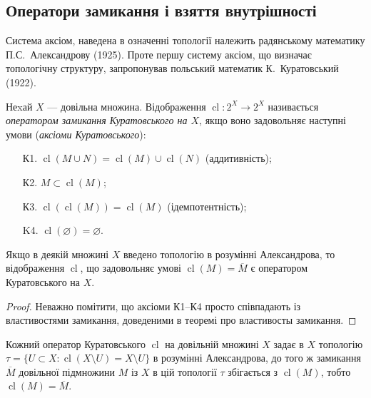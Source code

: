 \documentclass[a4paper, 12pt]{article}
\renewcommand{\emptyset}{\varnothing}
\DeclareMathOperator{\cl}{cl}
\begin{document}
\setcounter{section}{2}

\subsection{Оператори замикання і взяття внутрішності}

Система аксіом, наведена в означенні топології належить
радянському математику П.С.~Александрову (1925). Проте
першу систему аксіом, що визначає топологічну структуру, 
запропонував польський математик К.~Куратовський (1922).

\begin{definition}
	Неxай $X$ --- довільна множина. Відображення
	$\cl: 2^X \to 2^X$ називається \textit{оператором замикання
	Куратовського на $X$}, якщо воно задовольняє наступні
	умови (\textit{аксіоми Куратовського}):
	\begin{enumerate}
		\item[К1.] $\cl(M \cup N) = \cl(M) \cup \cl(N)$ (аддитивність);
		\item[К2.] $M \subset \cl(M)$;
		\item[К3.] $\cl(\cl(M)) = \cl(M)$ (ідемпотентність);
		\item[K4.] $\cl(\emptyset) = \emptyset$.
	\end{enumerate}
\end{definition}

\begin{theorem}
	Якщо в деякій множині $X$ введено топологію в
	розумінні Александрова, то відображення $\cl$, що
	задовольняє умові $\cl (M) = \overline{M}$ є оператором Куратовського
	на $X$.
\end{theorem}

\begin{proof}
	Неважно помітити, що аксіоми К1--К4 просто
	співпадають із властивостями замикання, доведеними в
	теоремі про властивосты замикання.
\end{proof}

\begin{theorem}
	Кожний оператор Куратовського $\cl$ на
	довільній множині $X$ задає в $X$ топологію
	$\tau = \{ U \subset X: \cl(X \setminus U) = X \setminus U\}$ в розумінні Александрова, до
	того ж замикання $\overline{M}$ довільної підмножини $M$ із $X$ в цій
	топології $\tau$ збігається з $\cl(M)$, тобто $\cl (M) = \overline{M}$.
\end{theorem}
\end{document}

